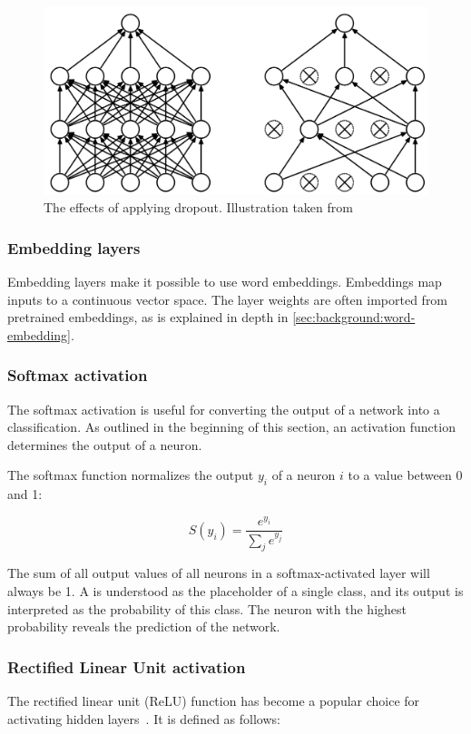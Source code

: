\begin{figure}
  \centering
  \includegraphics[width=\textwidth]{gfx/dropout-application.png}
  \caption[Effects of applying dropout]{The effects of applying dropout. Illustration taken from~\cite{srivastava2014dropout}}
  \label{fig:dropout-application}
\end{figure}

\subsubsection*{Embedding layers}
Embedding layers make it possible to use word embeddings.
Embeddings map inputs to a continuous vector space.
The layer weights are often imported from pretrained embeddings, as is explained in depth in \autoref{sec:background:word-embedding}.

\subsubsection*{Softmax activation}
The softmax activation is useful for converting the output of a network into a classification.
As outlined in the beginning of this section, an activation function determines the output of a neuron.

The softmax function normalizes the output $y_i$ of a neuron $i$ to a value between 0 and 1:

$$S(y_i) = \frac{e^{y_i}}{\sum_j e^{y_j}}$$

The sum of all output values of all neurons in a softmax-activated layer will always be 1.
A is understood as the placeholder of a single class, and its output is interpreted as the probability of this class.
The neuron with the highest probability reveals the prediction of the network.

\subsubsection*{Rectified Linear Unit activation}
The rectified linear unit (ReLU) function has become a popular choice for activating hidden layers~\cite{glorot2011deep}. It is defined as follows:

